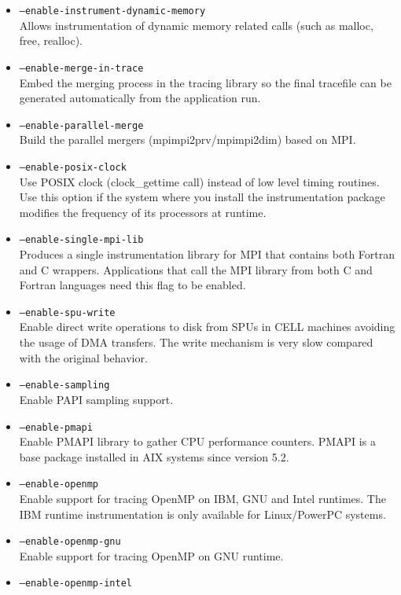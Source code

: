 \begin{itemize}

    \item {\tt --enable-instrument-dynamic-memory} \\
	Allows instrumentation of dynamic memory related calls (such as malloc, free, realloc).
	\item {\tt --enable-merge-in-trace} \\
	Embed the merging process in the tracing library so the final tracefile can be generated automatically from the application run.
	\item {\tt --enable-parallel-merge} \\
	Build the parallel mergers (mpimpi2prv/mpimpi2dim) based on MPI.
	\item {\tt --enable-posix-clock} \\
	Use POSIX clock (clock\_gettime call) instead of low level timing routines. Use this option if the system where you install the instrumentation package modifies the frequency of its processors at runtime.
	\item {\tt --enable-single-mpi-lib} \\
	Produces a single instrumentation library for MPI that contains both Fortran and C wrappers. Applications that call the MPI library from both C and Fortran languages need this flag to be enabled.
	\item {\tt --enable-spu-write} \\
	Enable direct write operations to disk from SPUs in CELL machines avoiding the usage of DMA transfers. The write mechanism is very slow compared with the original behavior.
	\item {\tt --enable-sampling} \\
	Enable PAPI sampling support.
	\item {\tt --enable-pmapi} \\
	Enable PMAPI library to gather CPU performance counters. PMAPI is a base package installed in AIX systems since version 5.2.
	\item {\tt --enable-openmp} \\
	Enable support for tracing OpenMP on IBM, GNU and Intel runtimes. The IBM runtime instrumentation is only available for Linux/PowerPC systems.
	\item {\tt --enable-openmp-gnu} \\
	Enable support for tracing OpenMP on GNU runtime.
	\item {\tt --enable-openmp-intel} \\

\end{itemize}
